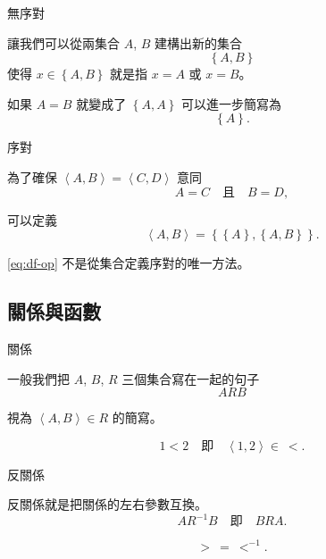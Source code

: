 \documentclass{Slideshow}
\begin{document}
\begin{frame}{無序對}
    \begin{definition}
        \newcommand{\thepair}{\left\{ A, B \right\}}
        讓我們可以從兩集合 $A$, $B$ 建構出新的集合
        \[ \thepair \]
        使得 $x \in \thepair$ 就是指 $x = A$ 或 $x = B$。
    \end{definition}

    如果 $A = B$ 就變成了 $\left\{ A, A \right\}$ 可以進一步簡寫為
    \[ \left\{ A \right\}.\]
\end{frame}

\begin{frame}{序對}
    \begin{definition}
        為了確保 $\left\langle A, B \right\rangle = \left\langle C, D \right\rangle$ 意同
        \[ A = C \quad \mbox{且} \quad B = D,\]

        可以定義
        \begin{equation}
            \left\langle A, B \right\rangle =
            \left\{ \left\{ A \right\}, \left\{ A, B \right\} \right\}.
            \label{eq:df-op}
        \end{equation}
    \end{definition}

    \eqref{eq:df-op} 不是從集合定義序對的唯一方法。
\end{frame}

\subsection{關係與函數}
\begin{frame}{關係}
    \begin{definition}
        一般我們把 $A$, $B$, $R$ 三個集合寫在一起的句子
        \[ ARB \]

        視為 $\left\langle A, B \right\rangle \in R$ 的簡寫。
    \end{definition}

    \begin{example}
        \[ 1 < 2 \quad \mbox{即} \quad \left\langle 1, 2 \right\rangle \in\ < .\]
    \end{example}
\end{frame}

\begin{frame}{反關係}
    \begin{definition}
        反關係就是把關係的左右參數互換。
        \[ A R^{-1} B \quad \mbox{即} \quad BRA.\]
    \end{definition}

    \begin{example}
        \[ > \ = \ <^{-1}.\]
    \end{example}
\end{frame}
\end{document}
